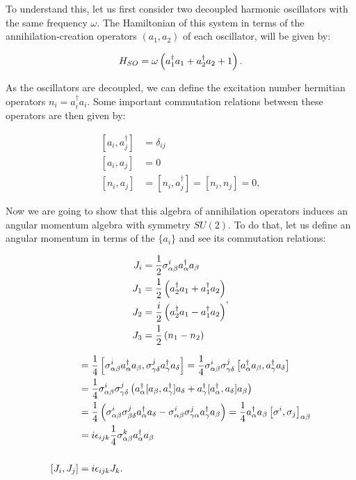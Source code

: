 To understand this, let us first consider two decoupled harmonic oscillators with the same frequency $\omega$. The Hamiltonian of this system in terms of the annihilation-creation operators $(a_1,a_2)$ of each oscillator, will be given by:

\begin{equation*}
H_{SO} = \omega\left( a_1^\dagger a_1 + a_2^\dagger a_2 + 1 \right).
\end{equation*}

As the oscillators are decoupled, we can define the excitation number hermitian operators $n_i = a_i^\dagger a_i$. Some important commutation relations between these operators are then given by:

\begin{align*}
\left[ a_i,a_j^\dagger\right] &= \delta_{ij}\\
\left[ a_i,a_j\right] &= 0\\
\left[ n_i, a_j \right] &= \left[ n_i, a_j^\dagger \right] = \left[ n_i, n_j \right] =0,
\end{align*}
 
Now we are going to show that this algebra of annihilation operators induces an angular momentum algebra with symmetry $SU(2)$. To do that, let us define an angular momentum in terms of the $\{a_i\}$ and see its commutation relations:

\begin{equation}
\begin{aligned}
J_i &= \frac{1}{2}\sigma^i_{\alpha\beta}a^\dagger_\alpha a_\beta \\
J_1 &= \frac{1}{2} \left( a_2^\dagger a_1 + a_1^\dagger a_2 \right)\\
J_2 &= \frac{i}{2} \left( a_2^\dagger a_1 - a_1^\dagger a_2 \right)\\
J_3 &= \frac{1}{2} \left( n_1-n_2 \right)
\end{aligned},
\label{eq:schwingerAM}
\end{equation}

\begin{align*}
[J_i,J_j] &= \frac{1}{4}\left[ \sigma^i_{\alpha\beta}a^\dagger_\alpha a_\beta,\sigma^j_{\gamma\delta}a^\dagger_\gamma a_\delta \right] = \frac{1}{4}\sigma^i_{\alpha\beta}\sigma^j_{\gamma\delta}\left[ a^\dagger_\alpha a_\beta,a^\dagger_\gamma a_\delta \right]\\
&= \frac{1}{4}\sigma^i_{\alpha\beta}\sigma^j_{\gamma\delta}\roundP{a^\dagger_\alpha [a_\beta,a^\dagger_\gamma ]a_\delta +  a^\dagger_\gamma[a^\dagger_\alpha, a_\delta]a_\beta }\\
&= \frac{1}{4}\roundP{\sigma^i_{\alpha\beta}\sigma^j_{\beta\delta}a^\dagger_\alpha a_\delta - \sigma^i_{\alpha\beta}\sigma^j_{\gamma\alpha}a^\dagger_\gamma a_\beta } = \frac{1}{4}a^\dagger_\alpha a_\beta \left[ \sigma^i,\sigma_j \right]_{\alpha\beta}\\
&= i\epsilon_{ijk} \frac{1}{4} \sigma^k_{\alpha\beta}a^\dagger_\alpha a_\beta \\
\\
[J_i,J_j] &= i\epsilon_{ijk}J_k.
\end{align*}

